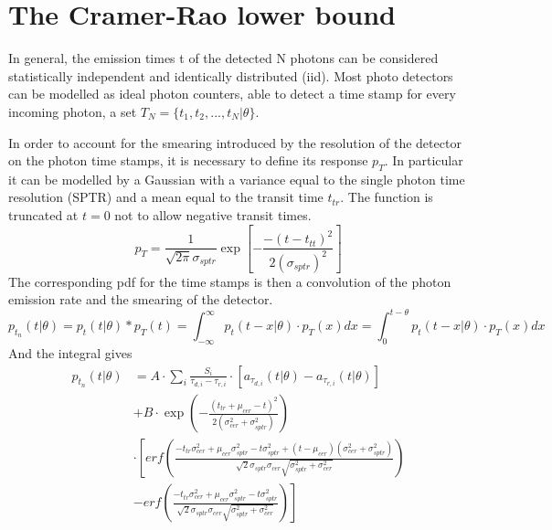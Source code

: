 \section{The Cramer-Rao lower bound}
In general, the emission times t of the detected N photons can be considered statistically independent and identically distributed (iid).
Most photo detectors can be modelled as ideal photon counters, able to detect a time stamp for every incoming photon, a set $T_{N} = \{ t_{1}, t_{2}, ..., t_{N}|\theta \}$.

In order to account for the smearing introduced by the resolution of the detector on the photon time stamps, it is necessary to define its response $p_{T}$. In particular  it can be modelled by a Gaussian with a variance equal to the single photon time resolution (SPTR) and a mean equal to the transit time $t_{tr}$. The function is truncated at $t=0$ not to allow negative transit times.
\begin{equation}
p_{T} = \frac{1}{\sqrt {2\pi} \sigma _{sptr}} \exp{\left[-\frac{-(t-t_{tt})^{2}}{2(\sigma _{sptr})^{2}}\right]}
\end{equation}
The corresponding pdf for the time stamps is then a convolution of the photon emission rate and the smearing of the detector.
\begin{equation}
p_{t_{n}}(t|\theta) = p_{t}(t|\theta)\ast p_{T}(t)= \int _{-\infty}^{\infty}p_{t}(t-x|\theta) \cdot p_{T}(x)dx = \int _{0}^{t-\theta}p_{t}(t-x|\theta) \cdot p_{T}(x)dx
\end{equation}
And the integral gives
\begin{equation}
\begin{align*}
p_{t_{n}}(t|\theta) &= A \cdot \sum _{i} \frac{S_{i}}{\tau _{d,i} - \tau _{r,i}} \cdot \left[ a_{\tau _{d, i}}(t|\theta) - a_{\tau _{r,i}}(t|\theta)\right]\\
& + B \cdot \exp{\left( -\frac{(t_{tr} + \mu _{cer} - t)^{2}}{2(\sigma _{cer}^{2}+ \sigma _{sptr}^{2})} \right)}\\
& \cdot \left[ erf\left( \frac{-t_{tr}\sigma _{cer}^{2} + \mu _{cer} \sigma _{sptr}^{2} -t\sigma _{sptr} ^{2} +(t-\mu _{cer})(\sigma _{cer}^{2}+\sigma _{sptr}^{2})}{\sqrt{2}\sigma _{sptr}\sigma_{cer}\sqrt{\sigma _{sptr}^{2}+\sigma_{cer}^{2}}} \right)\right.\\
& \left. - erf \left( \frac{-t_{tr}\sigma _{cer}^{2} + \mu _{cer} \sigma _{sptr}^{2} -t\sigma _{sptr} ^{2}}{\sqrt{2}\sigma _{sptr}\sigma_{cer}\sqrt{\sigma _{sptr}^{2}+\sigma_{cer}^{2}}} \right)\right]
\end{align*}
\end{equation}
